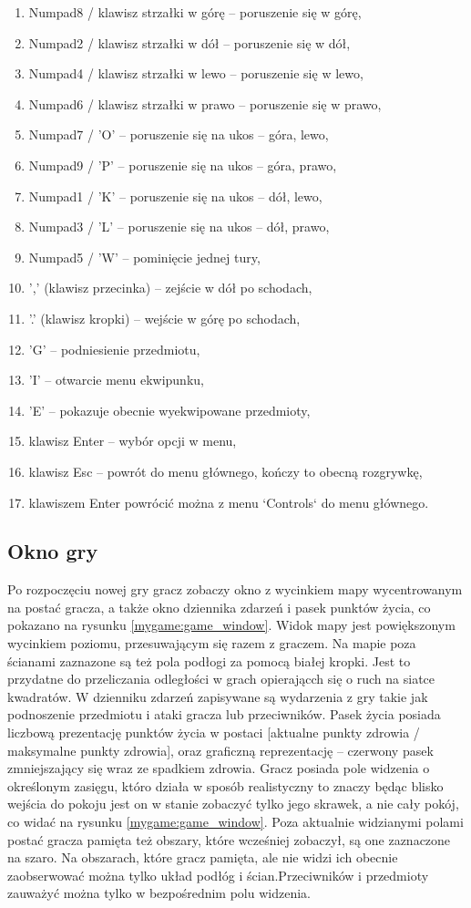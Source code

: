 \documentclass[12pt,twoside]{article}
\begin{document}
\begin{enumerate}
	\item Numpad8 / klawisz strzałki w górę -- poruszenie się w górę,
	\item Numpad2 / klawisz strzałki w dół -- poruszenie się w dół,
	\item Numpad4 / klawisz strzałki w lewo -- poruszenie się w lewo,
	\item Numpad6 / klawisz strzałki w prawo -- poruszenie się w prawo,
	\item Numpad7 / 'O' -- poruszenie się na ukos -- góra, lewo,
	\item Numpad9 / 'P' -- poruszenie się na ukos -- góra, prawo,
	\item Numpad1 / 'K' -- poruszenie się na ukos -- dół, lewo,
	\item Numpad3 / 'L' -- poruszenie się na ukos -- dół, prawo,
	\item Numpad5 / 'W' -- pominięcie jednej tury,
	\item ',' (klawisz przecinka) -- zejście w dół po schodach,
	\item '.' (klawisz kropki) -- wejście w górę po schodach,
	\item 'G' -- podniesienie przedmiotu,
	\item 'I' -- otwarcie menu ekwipunku,
	\item 'E' -- pokazuje obecnie wyekwipowane przedmioty,
	\item klawisz Enter -- wybór opcji w menu,
	\item klawisz Esc -- powrót do menu głównego, kończy to obecną rozgrywkę,
	\item klawiszem Enter powrócić można z menu `Controls` do menu głównego.
\end{enumerate}


\subsection{Okno gry}
Po rozpoczęciu nowej gry gracz zobaczy okno z wycinkiem mapy wycentrowanym na postać gracza, a także okno dziennika zdarzeń i pasek punktów życia, co pokazano na rysunku \ref{mygame:game_window}. Widok mapy jest powiększonym wycinkiem poziomu, przesuwającym się razem z graczem. Na mapie poza ścianami zaznazone są też pola podłogi za pomocą białej kropki. Jest to przydatne do przeliczania odległości w grach opierającch się o ruch na siatce kwadratów. W dzienniku zdarzeń zapisywane są wydarzenia z gry takie jak podnoszenie przedmiotu i ataki gracza lub przeciwników. Pasek życia posiada liczbową prezentację punktów życia w postaci [aktualne punkty zdrowia / maksymalne punkty zdrowia], oraz graficzną reprezentację -- czerwony pasek zmniejszający się wraz ze spadkiem zdrowia. Gracz posiada pole widzenia o określonym zasięgu, któro działa w sposób realistyczny to znaczy będąc blisko wejścia do pokoju jest on w stanie zobaczyć tylko jego skrawek, a nie cały pokój, co widać na rysunku \ref{mygame:game_window}. Poza aktualnie widzianymi polami postać gracza pamięta też obszary, które wcześniej zobaczył, są one zaznaczone na szaro. Na obszarach, które gracz pamięta, ale nie widzi ich obecnie zaobserwować można tylko układ podłóg i ścian.Przeciwników i przedmioty zauważyć można tylko w bezpośrednim polu widzenia.
\end{document}
